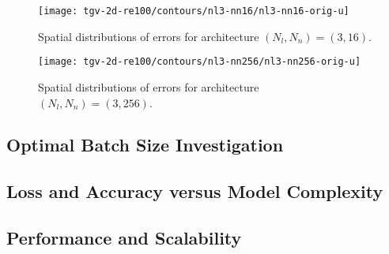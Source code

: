 \begin{figure}[H]
    \texttt{[image: tgv-2d-re100/contours/nl3-nn16/nl3-nn16-orig-u]}
    \caption{Spatial distributions of errors for architecture $(N_l, N_n)=(3, 16)$.}\label{fig:nl3-nn16-u-err-contour}
\end{figure}

\begin{figure}[H]
    \texttt{[image: tgv-2d-re100/contours/nl3-nn256/nl3-nn256-orig-u]}
    \caption{Spatial distributions of errors for architecture $(N_l, N_n)=(3, 256)$.}\label{fig:nl3-nn256-u-err-contour}
\end{figure}


\subsection{Optimal Batch Size Investigation}
\subsection{Loss and Accuracy versus Model Complexity}
\subsection{Performance and Scalability}

